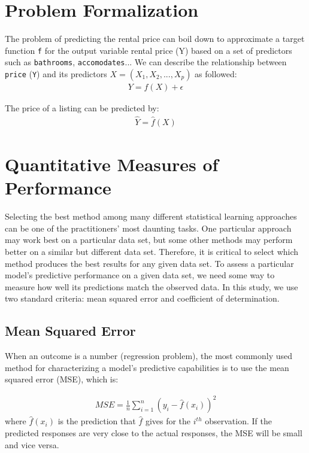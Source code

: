 \section{Problem Formalization}

The problem of predicting the rental price can boil down to approximate a target
function \texttt{f} for the output variable rental price (Y) based on a set of
predictors such as \texttt{bathrooms}, \texttt{accomodates}...
We can describe the relationship between \texttt{price} (\texttt{Y}) and its
predictors $ X = (X_1, X_2, . . . , X_p) $ as followed:
\begin{eqnarray}
    Y = f(X) + \epsilon
    \label{eqn:relationship-eqn}
\end{eqnarray}

The  price of a listing can be predicted by:
\begin{eqnarray}
    \hat{Y} = \hat{f}(X)
    \label{eqn:predicted-value}
\end{eqnarray}

\section{Quantitative Measures of Performance}

Selecting the best method among many different statistical learning approaches
can be one of the practitioners' most daunting tasks.  One particular approach
may work best on a particular data set, but some other methods may perform
better on a similar but different data set.  Therefore, it is critical to select
which method produces the best results for any given data set.  To assess a
particular model's predictive performance on a given data set, we need some way
to measure how well its predictions match the observed data.
In this study, we use two standard criteria: mean squared error and coefficient
of determination.

\subsection{Mean Squared Error}
When an outcome is a number (regression problem), the most commonly used method
for characterizing a model's predictive capabilities is to use the mean squared
error (MSE), which is:

\begin{eqnarray}
    \label{eqn:mse}
    MSE = \frac{1}{n} \sum_{i=1}^{n}(y_i - \hat{f}(x_i))^2
\end{eqnarray}
where $\hat{f}(x_i)$ is the prediction that $\hat{f}$ gives for the $i^{th}$
observation. If the predicted responses are very close to the actual responses,
the MSE will be small and vice versa.

